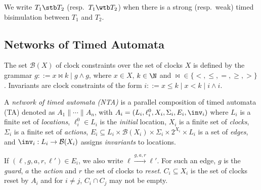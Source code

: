 \documentclass{LMCS}
\theoremstyle{plain}\newtheorem*{prop11}{Proposition~\ref{prop:states} bis}
\begin{document}
We write $T_1\stb T_2$ (resp.\ $T_1\wtb T_2$) when there is a strong (resp.\ weak)
timed bisimulation between $T_1$ and $T_2$.

\subsection{Networks of Timed Automata}
The set $\mathcal{B}(X)$ of clock constraints over the set of clocks $X$ is
defined by the grammar $g::=x\bowtie k \mid g \land g$, where $x \in X$,
$k \in \N$ and ${\bowtie} \in \{<, \leq, =, \geq, >\}$. Invariants are clock
constraints of the form $i::=x\leq k \mid x < k \mid i \land i$.
\begin{defi} A \emph{network of timed automata (NTA)} \cite{AD94} is a parallel composition
  of timed automata (TA) denoted as \mbox{$A_1\parallel\cdots\parallel A_n$},
  with $A_i=(L_i,\ell_i^0,X_i,\Sigma_i,E_i,\inv_i)$ where
  $L_i$ is a finite set of \emph{locations},
  $\ell_i^0 \in L_i$ is the \emph{initial} location,
  $X_i$ is a finite set of \emph{clocks},
  $\Sigma_i$ is a finite set of \emph{actions},
  $E_i \subseteq L_i \times \mathcal{B}(X_i) \times \Sigma_i \times 2^{X_i}\times L_i$
  is a set of \emph{edges},
  and $\inv_i: L_i \rightarrow \mathcal{B}(X_i)$ assigns \emph{invariants}
  to locations.
\end{defi}
If $(\ell,g,a,r,\ell') \in E_i$, we also write $\ell\xrightarrow{g,a,r}\ell'$.
For such an edge, $g$ is the \emph{guard}, $a$ the \emph{action} and $r$ the set of clocks to \emph{reset}.
$C_i\subseteq X_i$ is the set
of clocks reset by $A_i$ and for $i\neq j$, $C_i\cap C_j$ may not be
empty.
\end{document}
